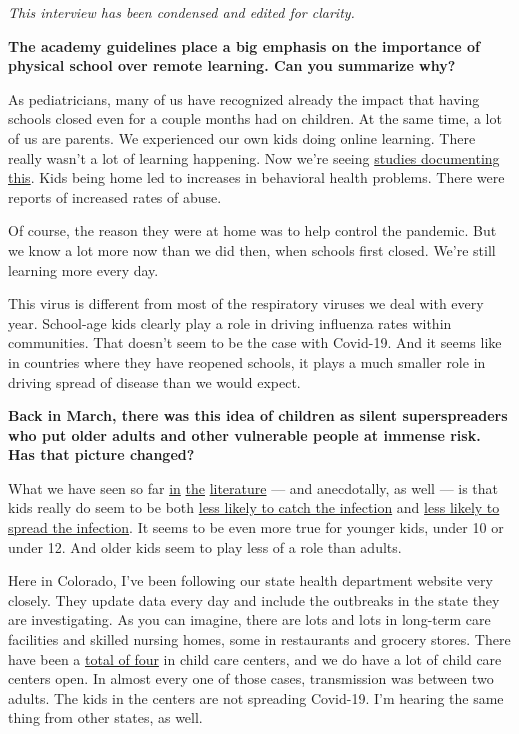 \emph{This interview has been condensed and edited for clarity.}

\textbf{The academy guidelines place a big emphasis on the importance of
physical school over remote learning. Can you summarize why?}

As pediatricians, many of us have recognized already the impact that
having schools closed even for a couple months had on children. At the
same time, a lot of us are parents. We experienced our own kids doing
online learning. There really wasn't a lot of learning happening. Now
we're seeing
\href{https://www.nytimes3xbfgragh.onion/2020/06/05/us/coronavirus-education-lost-learning.html}{studies
documenting this}. Kids being home led to increases in behavioral health
problems. There were reports of increased rates of abuse.

Of course, the reason they were at home was to help control the
pandemic. But we know a lot more now than we did then, when schools
first closed. We're still learning more every day.

This virus is different from most of the respiratory viruses we deal
with every year. School-age kids clearly play a role in driving
influenza rates within communities. That doesn't seem to be the case
with Covid-19. And it seems like in countries where they have reopened
schools, it plays a much smaller role in driving spread of disease than
we would expect.

\textbf{Back in March, there was this idea of children as silent
superspreaders who put older adults and other vulnerable people at
immense risk. Has that picture changed?}

What we have seen so far
\href{https://academic.oup.com/cid/article/doi/10.1093/cid/ciaa794/5862649}{in}
\href{https://www.thelancet.com/journals/lanchi/article/PIIS2352-4642(20)30095-X/fulltext\#seccestitle20}{the}
\href{https://adc.bmj.com/content/105/7/618}{literature} --- and
anecdotally, as well --- is that kids really do seem to be both
\href{https://pubmed.ncbi.nlm.nih.gov/32546824/}{less likely to catch
the infection} and
\href{https://pediatrics.aappublications.org/content/early/2020/05/22/peds.2020-004879}{less
likely to spread the infection}. It seems to be even more true for
younger kids, under 10 or under 12. And older kids seem to play less of
a role than adults.

Here in Colorado, I've been following our state health department
website very closely. They update data every day and include the
outbreaks in the state they are investigating. As you can imagine, there
are lots and lots in long-term care facilities and skilled nursing
homes, some in restaurants and grocery stores. There have been a
\href{https://covid19.colorado.gov/data/outbreak-data}{total of four} in
child care centers, and we do have a lot of child care centers open. In
almost every one of those cases, transmission was between two adults.
The kids in the centers are not spreading Covid-19. I'm hearing the same
thing from other states, as well.


